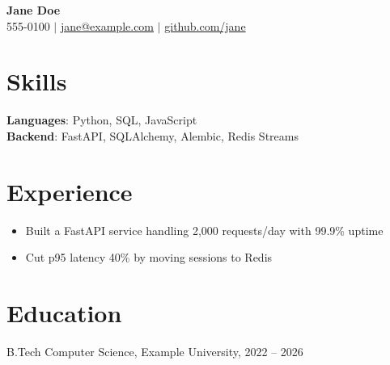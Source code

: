 \documentclass[letterpaper,10pt]{article}
\newcommand{\resumeItem}[1]{\item\small{#1}}
\begin{document}
\begin{center}
  \textbf{\Huge Jane Doe} \\ \vspace{1pt}
  \small 555-0100 $|$ \href{mailto:jane@example.com}{jane@example.com} $|$ \href{https://github.com/jane}{github.com/jane}
\end{center}

\section{Skills}
\textbf{Languages}{: Python, SQL, JavaScript} \\
\textbf{Backend}{: FastAPI, SQLAlchemy, Alembic, Redis Streams}

\section{Experience}
\begin{itemize}
  \resumeItem{Built a FastAPI service handling 2{,}000 requests/day with 99.9\% uptime}
  \resumeItem{Cut p95 latency 40\% by moving sessions to Redis}
\end{itemize}

\section{Education}
B.Tech Computer Science, Example University, 2022 -- 2026
\end{document}

